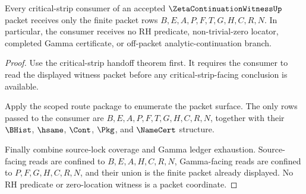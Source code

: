 \begin{theorem}
\label{thm:zeta-continuation-witness-critical-strip-consumer-scope}
Every critical-strip consumer of an accepted $\ZetaContinuationWitnessUp$ packet receives only the finite packet rows $B,E,A,P,F,T,G,H,C,R,N$. In particular, the consumer receives no RH predicate, non-trivial-zero locator, completed Gamma certificate, or off-packet analytic-continuation branch.
\end{theorem}
\begin{proof}
Use the critical-strip handoff theorem first. It requires the consumer to read the displayed witness packet before any critical-strip-facing conclusion is available.

Apply the scoped route package to enumerate the packet surface. The only rows passed to the consumer are $B,E,A,P,F,T,G,H,C,R,N$, together with their $\BHist$, $\hsame$, $\Cont$, $\Pkg$, and $\NameCert$ structure.

Finally combine source-lock coverage and Gamma ledger exhaustion. Source-facing reads are confined to $B,E,A,H,C,R,N$, Gamma-facing reads are confined to $P,F,G,H,C,R,N$, and their union is the finite packet already displayed. No RH predicate or zero-location witness is a packet coordinate.
\end{proof}

